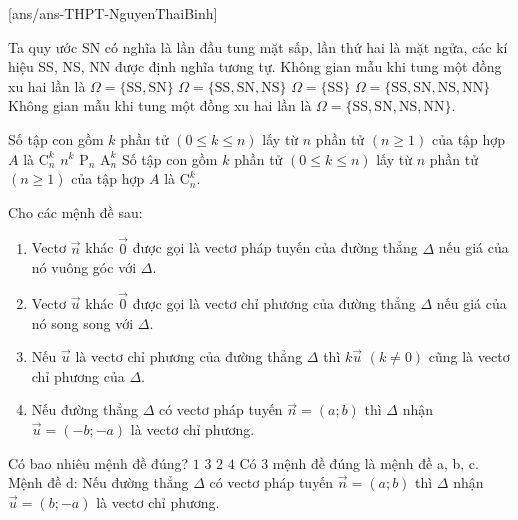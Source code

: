 
[ans/ans-THPT-NguyenThaiBinh]


\begin{ex}%

	Ta quy ước SN có nghĩa là lần đầu tung mặt sấp, lần thứ hai là mặt ngửa, các kí hiệu SS, NS, NN được định nghĩa tương tự. Không gian mẫu khi tung một đồng xu hai lần là
	\choice
	{$\Omega=\{\mathrm{SS}, \mathrm{SN}\}$}
	{$\Omega=\{\mathrm{SS}, \mathrm{SN}, \mathrm{NS}\}$}
	{$\Omega=\{\mathrm{SS}\}$}
	{\True $\Omega=\{\mathrm{SS}, \mathrm{SN}, \mathrm{NS}, \mathrm{NN}\}$}
	\loigiai
	{
	Không gian mẫu khi tung một đồng xu hai lần là $\Omega=\{\mathrm{SS}, \mathrm{SN}, \mathrm{NS}, \mathrm{NN}\}$.
	}
\end{ex}
\begin{ex}%

	Số tập con gồm $k$ phần tử $(0 \leq k \leq n)$ lấy từ $n$ phần tử $(n \geq 1)$ của tập hợp $A$ là
	\choice
	{\True $\mathrm{C}_n^k$}
	{$n^k$}
	{$\mathrm{P}_n$}
	{$\mathrm{A}_n^k$}
	\loigiai
	{
	Số tập con gồm $k$ phần tử $(0 \leq k \leq n)$ lấy từ $n$ phần tử $(n \geq 1)$ của tập hợp $A$ là $\mathrm{C}_n^k$.	
	}
\end{ex}
\begin{ex}%

Cho các mệnh đề sau:
\begin{enumerate}
	\item Vectơ $\vec{n}$ khác $\overrightarrow{0}$ được gọi là vectơ pháp tuyến của đường thẳng $\Delta$ nếu giá của nó vuông góc với $\Delta$.
	\item Vectơ $\vec{u}$ khác $\overrightarrow{0}$ được gọi là vectơ chỉ phương của đường thẳng $\Delta$ nếu giá của nó song song với $\Delta$.
	\item Nếu $\vec{u}$ là vectơ chỉ phương của đường thẳng $\Delta$ thì $k \vec{u}$ $(k \neq 0)$ cũng là vectơ chỉ phương của $\Delta$.
	\item Nếu đường thẳng $\Delta$ có vectơ pháp tuyến $\vec{n}=(a ; b)$ thì $\Delta$ nhận $\vec{u}=(-b ;-a)$ là vectơ chỉ phương.
\end{enumerate}
Có bao nhiêu mệnh đề đúng?
	\choice
	{$1$}
	{\True $3$}
	{$2$}
	{$4$}
	\loigiai
	{
	Có 3 mệnh đề đúng là mệnh đề a, b, c.\\
	Mệnh đề d: Nếu đường thẳng $\Delta$ có vectơ pháp tuyến $\vec{n}=(a ; b)$ thì $\Delta$ nhận $\vec{u}=(b ;-a)$ là vectơ chỉ phương.
	}
\end{ex}
